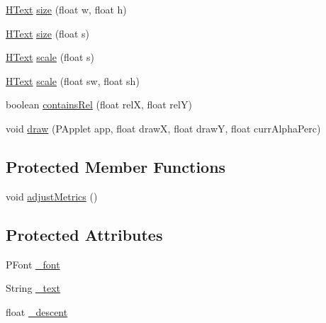 \begin{DoxyCompactItemize}
\item 
\hyperlink{classhype_1_1drawable_1_1_h_text}{H\-Text} \hyperlink{classhype_1_1drawable_1_1_h_text_a1a47daa77145971b6ef72a0fc90a7911}{size} (float w, float h)
\item 
\hyperlink{classhype_1_1drawable_1_1_h_text}{H\-Text} \hyperlink{classhype_1_1drawable_1_1_h_text_a37c3535711e3a07e3b4b7aaaecbbf717}{size} (float s)
\item 
\hyperlink{classhype_1_1drawable_1_1_h_text}{H\-Text} \hyperlink{classhype_1_1drawable_1_1_h_text_a8480b4af6a3e5aa6721f1cf4e3653f5e}{scale} (float s)
\item 
\hyperlink{classhype_1_1drawable_1_1_h_text}{H\-Text} \hyperlink{classhype_1_1drawable_1_1_h_text_ad998eb925e706587a3e01da5b0f774fe}{scale} (float sw, float sh)
\item 
boolean \hyperlink{classhype_1_1drawable_1_1_h_text_a0e58a8da08b4b63657be00cbc8a317ec}{contains\-Rel} (float rel\-X, float rel\-Y)
\item 
void \hyperlink{classhype_1_1drawable_1_1_h_text_ac144e0c1a097b3fc87d88e4af5fb36a3}{draw} (P\-Applet app, float draw\-X, float draw\-Y, float curr\-Alpha\-Perc)
\end{DoxyCompactItemize}
\subsection*{Protected Member Functions}
\begin{DoxyCompactItemize}
\item 
void \hyperlink{classhype_1_1drawable_1_1_h_text_a9453318bde7a8e17a0624fc73da871f2}{adjust\-Metrics} ()
\end{DoxyCompactItemize}
\subsection*{Protected Attributes}
\begin{DoxyCompactItemize}
\item 
P\-Font \hyperlink{classhype_1_1drawable_1_1_h_text_aa55ece9860aeab65ec09852184db221a}{\-\_\-font}
\item 
String \hyperlink{classhype_1_1drawable_1_1_h_text_a110b21b7f159962f894f70bc46e075c6}{\-\_\-text}
\item 
float \hyperlink{classhype_1_1drawable_1_1_h_text_a35e53327d521ba4a19714923ec9b5cd2}{\-\_\-descent}
\end{DoxyCompactItemize}


